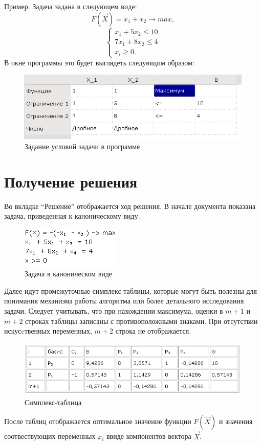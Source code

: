 Пример. Задача задана в следующем виде:
\begin{equation}
 	F(\vec{X}) = x_1+x_2 \to max,
\end{equation}
\begin{equation}
\begin{cases}
x_1 + 5x_2 \le 10\\
7x_1 + 8x_2 \le 4\\
x_i \ge 0.
\end{cases}
\end{equation}
\clearpage
В окне программы это будет выглядеть следующим образом:
\begin{figure}[ht]
\centering
\includegraphics[scale=1.0]{img/problem1.png}
\caption{Задание условий задачи в программе}
\end{figure}

\section{Получение решения}
Во вкладке “Решение” отображается ход решения. В начале документа показана задача, приведенная к каноническому виду.

\begin{figure}[ht]
\centering
\includegraphics[scale=1.0]{img/canonical.png}
\caption{Задача в каноническом виде}
\end{figure}

Далее идут промежуточные симплекс-таблицы, которые могут быть полезны для понимания механизма работы алгоритма или более детального исследования задачи. Следует учитывать, что при нахождении максимума, оценки в $m+1$ и $m+2$ строках таблицы записаны с противоположными знаками. При отсутствии искусcтвенных переменных, $m+2$ строка не отображается.

\begin{figure}[hb]
\centering
\includegraphics[scale=1.0]{img/simplextable.png}
\caption{Симплекс-таблица}
\end{figure}
После таблиц отображается оптимальное значение функции $F(\vec{X})$ и значения соотвествующих переменных $x_{i}$ ввиде компонентов вектора $\vec{X}$.

